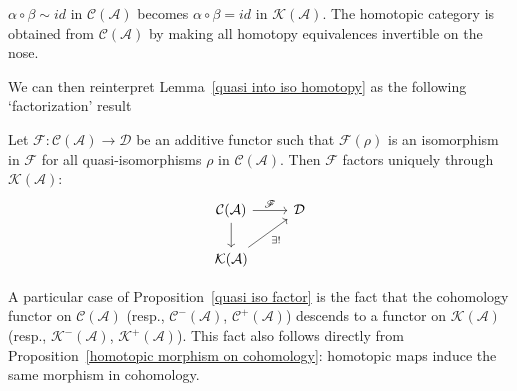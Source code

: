 $\alpha\circ\beta\sim id$ in $\mathcal{C}(\mathcal{A})$ becomes $\alpha\circ\beta=id$ in $\mathcal{K}(\mathcal{A})$. The homotopic category is obtained from $\mathcal{C}(\mathcal{A})$ by making all homotopy equivalences invertible on the nose.\par
We can then reinterpret Lemma~\ref{quasi into iso homotopy} as the following ‘factorization’ result
\begin{proposition}\label{quasi iso factor}
Let $\mathscr{F}:\mathcal{C}(\mathcal{A})\to\mathcal{D}$ be an additive functor such that $\mathscr{F}(\rho)$ is an isomorphism in $\mathscr{F}$ for all quasi-isomorphisms $\rho$ in $\mathcal{C}(\mathcal{A})$. Then $\mathscr{F}$ factors uniquely through $\mathcal{K}(\mathcal{A})$:
\[\begin{tikzcd}
\mathcal{C}(\mathcal{A})\ar[d]\ar[r,"\mathscr{F}"]&\mathcal{D}\\
\mathcal{K}(\mathcal{A})\ar[ru,swap,"\exists!"]
\end{tikzcd}\]
\end{proposition}
A particular case of Proposition~\ref{quasi iso factor} is the fact that the cohomology functor on $\mathcal{C}(\mathcal{A})$ (resp., $\mathcal{C}^-(\mathcal{A})$, $\mathcal{C}^+(\mathcal{A})$) descends to a functor on $\mathcal{K}(\mathcal{A})$ (resp., $\mathcal{K}^-(\mathcal{A})$, $\mathcal{K}^+(\mathcal{A})$). This fact also follows directly from Proposition~\ref{homotopic morphism on cohomology}: homotopic maps induce the same morphism in cohomology.
